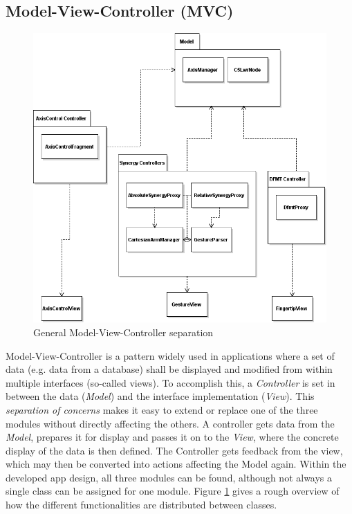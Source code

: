 \subsection{Model-View-Controller (MVC)}

\begin{figure}
	\caption{\label{fig:conc:mvc}General Model-View-Controller separation}
	\includegraphics[width=\linewidth]{assets/chpt_concepts/sw/mvc.png}
\end{figure}

Model-View-Controller is a pattern widely used in applications where a set of data (e.g. data from a database) shall be displayed and modified from within multiple interfaces (so-called views)\cite{Eilebrecht2013}. To accomplish this, a \textit{Controller} is set in between the data (\textit{Model}) and the interface implementation (\textit{View}). This \textit{separation of concerns} makes it easy to extend or replace one of the three modules without directly affecting the others. A controller gets data from the \textit{Model}, prepares it for display and passes it on to the \textit{View}, where the concrete display of the data is then defined. The Controller gets feedback from the view, which may then be converted into actions affecting the Model again. Within the developed app design, all three modules can be found, although not always a single class can be assigned for one module. Figure \ref{fig:conc:mvc} gives a rough overview of how the different functionalities are distributed between classes.

